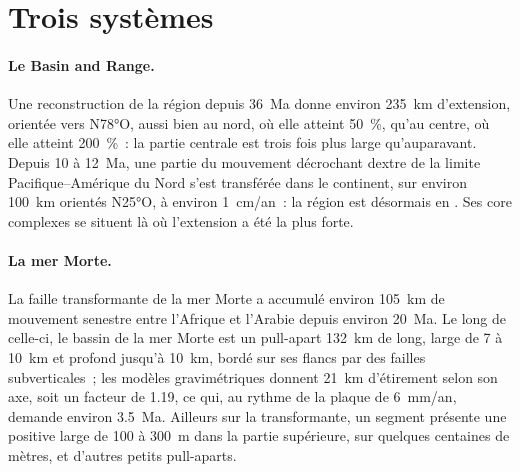 \begin{omfigure}
\par{}\label{fig:b3:extension-strike-slip:strike-slip}
\end{omfigure}

\section{Trois systèmes}\label{sec:b3:extension-strike-slip:systems}

\paragraph{Le Basin and Range.} Une reconstruction de la région depuis
\qty{36}{Ma} donne environ \qty{235}{km} d'extension, orientée vers
N\ang{78}O, aussi bien au nord, où elle atteint \qty{50}{\percent}, qu'au
centre, où elle atteint \qty{200}{\percent}~: la partie centrale est trois
fois plus large qu'auparavant. Depuis 10 à \qty{12}{Ma}, une partie du
mouvement décrochant dextre de la limite Pacifique--Amérique du Nord s'est
transférée dans le continent, sur environ \qty{100}{km} orientés N\ang{25}O, à environ \qty{1}{cm/an}~: la région est
désormais en . Ses core complexes se situent là où l'extension a été la plus forte.

\paragraph{La mer Morte.} La faille transformante de la mer Morte a accumulé
environ \qty{105}{km} de mouvement senestre entre l'Afrique et l'Arabie depuis
environ \qty{20}{Ma}. Le long de celle-ci, le bassin de la mer Morte est un pull-apart \qty{132}{km}
de long, large de 7 à \qty{10}{km} et profond jusqu'à \qty{10}{km}, bordé sur
ses flancs par des failles subverticales~; les modèles gravimétriques donnent \qty{21}{km} d'étirement
selon son axe, soit un facteur de 1.19, ce qui, au rythme de la plaque de
\qty{6}{mm/an}, demande environ \qty{3.5}{Ma}. Ailleurs sur la transformante, un
segment présente une  positive large de 100 à \qty{300}{m} dans la
partie supérieure, sur quelques centaines de mètres, et d'autres petits pull-aparts.

